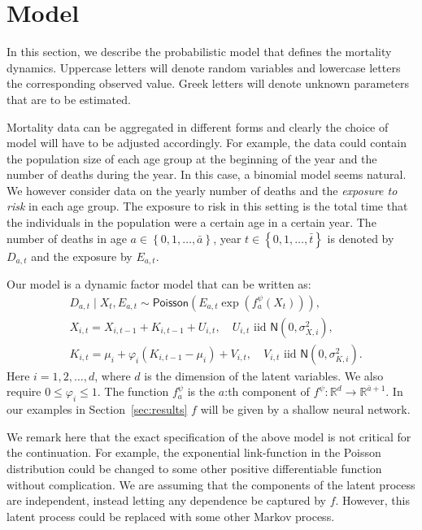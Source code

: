 \documentclass[preprint,12pt]{elsarticle}
\newcommand{\cur}[1]{\left\{#1\right\}}
\newcommand{\pa}[1]{\left(#1\right)}
\begin{document}
\section{Model}\label{sec:model}
In this section, we describe the probabilistic model that defines the mortality dynamics. Uppercase letters will denote random variables and lowercase letters the corresponding observed value. Greek letters will denote unknown parameters that are to be estimated. 

Mortality data can be aggregated in different forms and clearly the choice of model will have to be adjusted accordingly. For example, the data could contain the population size of each age group at the beginning of the year and the number of deaths during the year. In this case, a binomial model seems natural. We however consider data on the yearly number of deaths and the \emph{exposure to risk} in each age group. The exposure to risk in this setting is the total time that the individuals in the population were a certain age in a certain year.  The number of deaths in age $a\in \cur{0,1,\ldots, \bar a}$, year $t\in \cur{0,1,\ldots, \bar t}$ is denoted by $D_{a,t}$ and the exposure by $E_{a,t}$. 

Our model is a dynamic factor model that can be written as:
\begin{align}
	& D_{a,t}\mid X_t,E_{a,t} \sim  \mathsf{Poisson}\pa{E_{a,t}\exp\pa{f^\psi_{a}(X_t)}},\label{eq:deathDist}\\
	& X_{i,t} =X_{i,t-1} + K_{i,t-1} + U_{i,t},\quad U_{i,t} \text{ iid }  \mathsf{N}(0,\sigma^2_{X,i}),\label{eq:state_level}\\
	& K_{i,t} = \mu_i + \varphi_i(K_{i,t-1} - \mu_i) + V_{i,t},\quad V_{i,t} \text{ iid }   \mathsf{N}(0,\sigma^2_{K,i}).\label{eq:state_trend}
\end{align}
Here $i=1,2,\ldots , d$, where $d$ is the dimension of the latent variables. We also require $0\leq \varphi_i \leq 1$. The function $f^\psi_a$ is the $a$:th component of $f^\psi:\mathbb R^d \to \mathbb R^{\bar a+1}$. In our examples in Section~\ref{sec:results} $f$ will be given by a shallow neural network.

We remark here that the exact specification of the above model is not critical for the continuation. For example, the exponential link-function in the Poisson distribution could be changed to some other positive differentiable function without complication. We are assuming that the components of the latent process are independent, instead letting any dependence be captured by $f$. However, this latent process could be replaced with some other Markov process.
\end{document}
